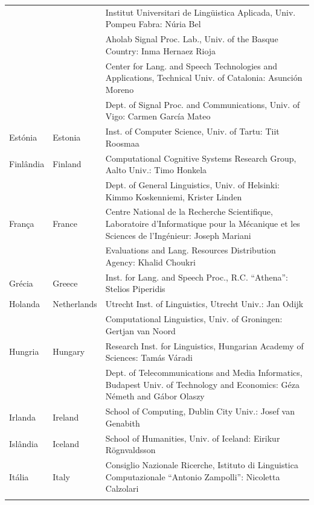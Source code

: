 \documentclass[]{../metanetpaper}
\begin{document}
\begin{longtable}{llp{105mm}}
  & & Institut Universitari de Lingüistica Aplicada, Univ. Pompeu Fabra: Núria Bel \\ \addlinespace 
  & & Aholab Signal Proc. Lab., Univ. of the Basque Country: Inma Hernaez Rioja \\ \addlinespace 
  & & Center for Lang. and Speech Technologies and Applications, Technical Univ. of Catalonia: Asunción Moreno \\ \addlinespace 
  & & Dept. of Signal Proc. and Communications, Univ. of Vigo: Carmen García Mateo \\ \addlinespace 
  Estónia & \textcolor{grey1}{Estonia} & Inst. of Computer Science, Univ. of Tartu: Tiit Roosmaa \\ \addlinespace
  Finlândia & \textcolor{grey1}{Finland} & Computational Cognitive Systems Research Group, Aalto Univ.: Timo Honkela \\ \addlinespace
  & & Dept. of General Linguistics, Univ. of Helsinki: Kimmo Koskenniemi, Krister Linden \\ \addlinespace
  França & \textcolor{grey1}{France} & Centre National de la Recherche Scientifique, Laboratoire d'Informatique pour la Mécanique et les Sciences de l'Ingénieur: Joseph Mariani \\ \addlinespace
  & & Evaluations and Lang. Resources Distribution Agency: Khalid Choukri \\ \addlinespace 
  Grécia & \textcolor{grey1}{Greece} & Inst. for Lang. and Speech Proc., R.C. “Athena”: Stelios Piperidis \\ \addlinespace
  Holanda & \textcolor{grey1}{Netherlands} & Utrecht Inst. of Linguistics, Utrecht Univ.: Jan Odijk \\ \addlinespace 
  & & Computational Linguistics, Univ. of Groningen: Gertjan van Noord \\ \addlinespace
  Hungria & \textcolor{grey1}{Hungary} & Research Inst. for Linguistics, Hungarian Academy of Sciences: Tamás Váradi \\  \addlinespace
  & & Dept. of Telecommunications and Media Informatics, Budapest Univ. of Technology and Economics: Géza Németh and Gábor Olaszy \\ \addlinespace
  Irlanda & \textcolor{grey1}{Ireland} & School of Computing, Dublin City Univ.: Josef van Genabith \\ \addlinespace
  Islândia & \textcolor{grey1}{Iceland} & School of Humanities, Univ. of Iceland: Eirikur Rögnvaldsson \\ \addlinespace
  Itália & \textcolor{grey1}{Italy} & Consiglio Nazionale Ricerche, Istituto di Linguistica Computazionale “Antonio Zampolli”: Nicoletta Calzolari \\ \addlinespace

\end{longtable}
\end{document}

